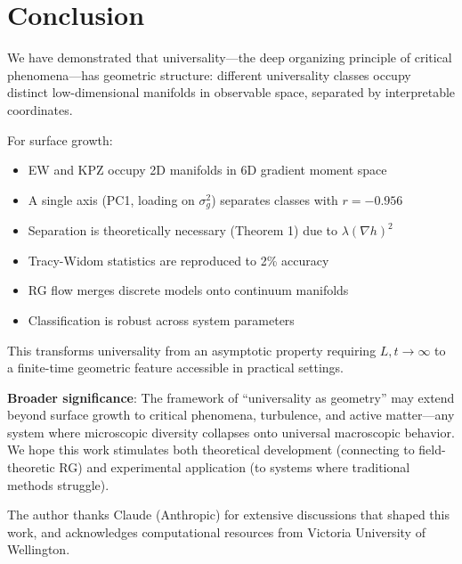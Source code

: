 \documentclass[aps,pre,twocolumn,superscriptaddress,showpacs,longbibliography]{revtex4-2}
\begin{document}
\section{Conclusion}
\label{sec:conclusion}

We have demonstrated that universality---the deep organizing principle of critical phenomena---has geometric structure: different universality classes occupy distinct low-dimensional manifolds in observable space, separated by interpretable coordinates.

For surface growth:
\begin{itemize}
\item EW and KPZ occupy 2D manifolds in 6D gradient moment space
\item A single axis (PC1, loading on $\sigma_g^2$) separates classes with $r = -0.956$
\item Separation is theoretically necessary (Theorem 1) due to $\lambda(\nabla h)^2$
\item Tracy-Widom statistics are reproduced to 2\% accuracy
\item RG flow merges discrete models onto continuum manifolds
\item Classification is robust across system parameters
\end{itemize}

This transforms universality from an asymptotic property requiring $L, t \to \infty$ to a finite-time geometric feature accessible in practical settings.

\textbf{Broader significance}: The framework of ``universality as geometry'' may extend beyond surface growth to critical phenomena, turbulence, and active matter---any system where microscopic diversity collapses onto universal macroscopic behavior. We hope this work stimulates both theoretical development (connecting to field-theoretic RG) and experimental application (to systems where traditional methods struggle).

\begin{acknowledgments}
The author thanks Claude (Anthropic) for extensive discussions that shaped this work, and acknowledges computational resources from Victoria University of Wellington.
\end{acknowledgments}
\end{document}
